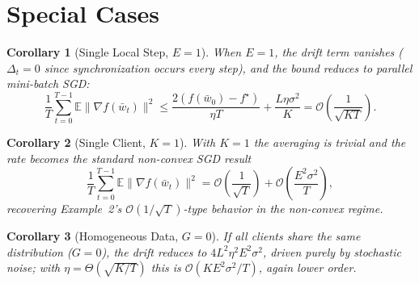 \documentclass[11pt]{article}
\newtheorem{corollary}{Corollary}
\begin{document}
\section*{Special Cases}

\begin{corollary}[Single Local Step, $E=1$]
When $E=1$, the drift term vanishes ($\Delta_t = 0$ since synchronization
occurs every step), and the bound reduces to parallel mini-batch SGD:
\[
\frac{1}{T}\sum_{t=0}^{T-1}\mathbb{E}\|\nabla f(\bar w_t)\|^2
\le \frac{2(f(\bar w_0)-f^\star)}{\eta T} + \frac{L\eta\sigma^2}{K}
= \mathcal{O}\!\left(\frac{1}{\sqrt{KT}}\right).
\]
\end{corollary}

\begin{corollary}[Single Client, $K=1$]
With $K=1$ the averaging is trivial and the rate becomes the standard
non-convex SGD result
\[
\frac{1}{T}\sum_{t=0}^{T-1}\mathbb{E}\|\nabla f(\bar w_t)\|^2
= \mathcal{O}\!\left(\frac{1}{\sqrt{T}}\right) + \mathcal{O}\!\left(\frac{E^2\sigma^2}{T}\right),
\]
recovering Example~2's $\mathcal{O}(1/\sqrt T)$-type behavior in the
non-convex regime.
\end{corollary}

\begin{corollary}[Homogeneous Data, $G=0$]
If all clients share the same distribution ($G=0$), the drift reduces to
$4L^2\eta^2 E^2 \sigma^2$, driven purely by stochastic noise; with
$\eta=\Theta(\sqrt{K/T})$ this is $\mathcal{O}(KE^2\sigma^2/T)$, again
lower order.
\end{corollary}
\end{document}

